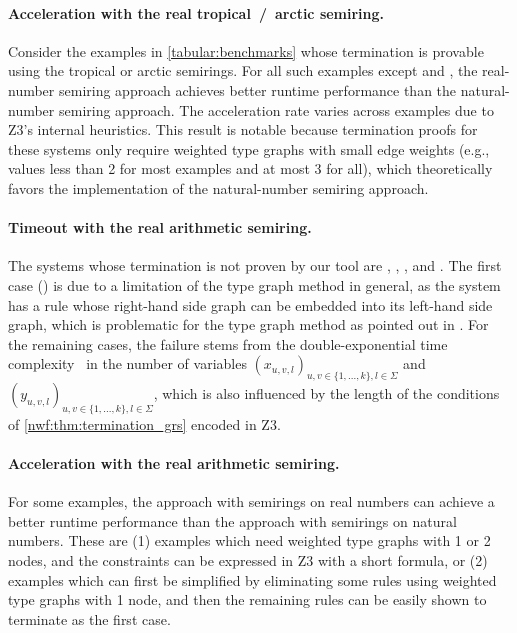 \paragraph{Acceleration with the real tropical~/~arctic semiring.} 
Consider the examples in \autoref{tabular:benchmarks} whose termination is provable using the tropical or arctic semirings. For all such examples except \cite[Example 5]{plump2018modular} and \cite[Example 4]{bruggink2015proving}, the real-number semiring approach achieves better runtime performance than the natural-number semiring approach. The acceleration rate varies across examples due to Z3's internal heuristics. This result is notable because termination proofs for these systems only require weighted type graphs with small edge weights (e.g., values less than 2 for most examples and at most 3 for all), which theoretically favors the implementation of the natural-number semiring approach.

\paragraph{Timeout with the real arithmetic semiring.}
The systems whose termination is not proven by our tool are \cite[Example 6]{plump2018modular}, \cite[Examples 5 and 6]{bruggink2015proving}, \cite[Example 4]{plump2018modular}, and \cite[Example 5]{bruggink2014termination}.
The first case (\cite[Example 6]{plump2018modular}) is due to a limitation of the type graph method in general, as the system has a rule whose right-hand side graph can be embedded into its left-hand side graph, which is problematic for the type graph method as pointed out in \cite[Example D.4]{endrullis2024generalized_arxiv_v2}. For the remaining cases,
 the failure stems from the double-exponential time complexity~\cite{collins1974quantifier,z3realarithmetic} in the number of variables \( (x_{u,v,l})_{u,v \in \{1,...,k\}, l \in \Sigma} \) and \( (y_{u,v,l})_{u,v \in \{1,...,k\}, l \in \Sigma} \), which is also influenced by the length of the conditions of \autoref{nwf:thm:termination_grs} encoded in Z3.
\paragraph{Acceleration with the real arithmetic semiring.} For some examples, the approach with semirings on real numbers can achieve a better runtime performance than the approach with semirings on natural numbers. These are (1) examples which need weighted type graphs with 1 or 2 nodes, and the constraints can be expressed in Z3 with a short formula, or (2) examples which can first be simplified by eliminating some rules using weighted type graphs with 1 node, and then the remaining rules can be 
easily shown to terminate
as the first case.
